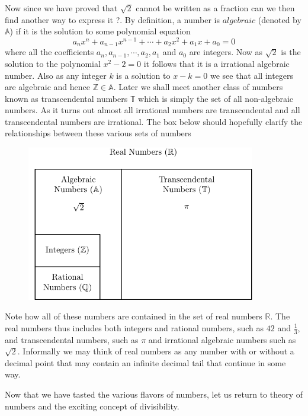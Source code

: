 \myindent Now since we have proved that $\sqrt{2}$ cannot be written as a fraction can we then find another way to express it ?. By definition, a number is $algebraic$ (denoted by $\mathbb{A}$) if it is the solution to some polynomial equation
\[
a_{n}x^{n} + a_{n-1}x^{n-1} + \cdots + a_{2}x^{2} + a_{1}x + a_0 = 0 
\]
where all the coefficients $a_n, a_{n-1}, \cdots, a_2, a_1$ and $a_0$ are integers. Now as $\sqrt{2}$ is the solution to the polynomial $x^2 - 2 = 0$ it follows that it is a irrational algebraic number. Also as any integer $k$ is a solution to $x-k=0$ we see that all integers are algebraic and hence $\mathbb{Z} \in \mathbb{A}$. Later we shall meet another class of numbers known as transcendental numbers  $\mathbb{T}$ which is simply the set of all non-algebraic numbers. As it turns out almost all irrational numbers are transcendental and all transcendental numbers are irrational. The box below should hopefully clarify the relationships between these various sets of numbers
\begin{figure}[htb!]
\begin{center} 
\includegraphics[width=10cm]{images/number_types.pdf}
\end{center}
\end{figure}

Note how all of these numbers are contained in the set of real numbers $\mathbb{R}$.  The real numbers thus includes both integers and rational numbers, such as $42$ and $\frac{1}{3}$, and transcendental numbers, such as $\pi$ and irrational algebraic numbers such as $\sqrt{2}$. Informally we may think of real numbers as any number with or without a decimal point that may contain an infinite decimal tail that continue in some way.

Now that we have tasted the various flavors of numbers, let us return to theory of numbers and the exciting concept of divisibility.



